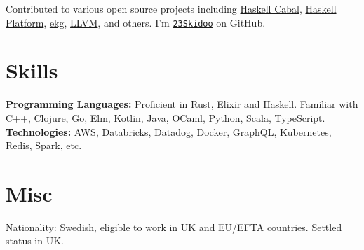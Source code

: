 \documentclass[margin,line]{res}
\begin{document}
\begin{resume}
      Contributed to various open source projects including
      \href{https://github.com/haskell/cabal/}{Haskell Cabal}, \href{https://www.haskell.org/platform/}{Haskell Platform},
      \href{https://hackage.haskell.org/package/ekg}{ekg}, \href{https://llvm.org/}{LLVM}, and others.
      I'm \href{https://github.com/23Skidoo/}{\tt 23Skidoo} on GitHub.

      \section{\sc Skills}

       {\bf Programming Languages:} Proficient in Rust, Elixir and Haskell. Familiar
      with C++, Clojure, Go, Elm, Kotlin, Java, OCaml, Python, Scala, TypeScript.\\
      {\bf Technologies:} AWS, Databricks, Datadog, Docker, GraphQL, Kubernetes,
      Redis, Spark, etc.

      \section{\sc Misc}

      Nationality: Swedish, eligible to work in UK and EU/EFTA countries. Settled status in UK.

\end{resume}
\end{document}
